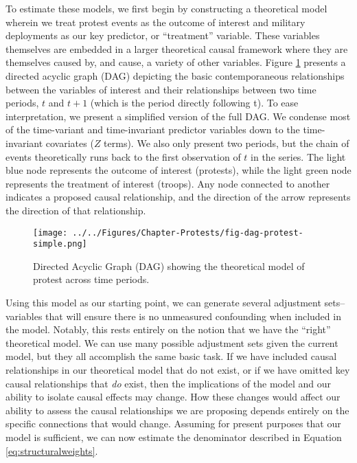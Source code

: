 		To estimate these models, we first begin by constructing a theoretical model wherein we treat protest events as the outcome of interest and military deployments as our key predictor, or ``treatment'' variable. These variables themselves are embedded in a larger theoretical causal framework where they are themselves caused by, and cause, a variety of other variables. Figure \ref{fig:dagtroops} presents a directed acyclic graph (DAG) depicting the basic contemporaneous relationships between the variables of interest and their relationships between two time periods, $t$ and $t+1$ (which is the period directly following t). To ease interpretation, we present a simplified version of the full DAG. We condense most of the time-variant and time-invariant predictor variables down to the time-invariant covariates ($Z$ terms). We also only present two periods, but the chain of events theoretically runs back to the first observation of $t$ in the series. The light blue node represents the outcome of interest (protests), while the light green node represents the treatment of interest (troops). Any node connected to another indicates a proposed causal relationship, and the direction of the arrow represents the direction of that relationship.
		
		\begin{figure}[t]
			\centering\texttt{[image: ../../Figures/Chapter-Protests/fig-dag-protest-simple.png]}
			\caption{Directed Acyclic Graph (DAG) showing the theoretical model of protest across time periods.}
			\label{fig:dagtroops}
		\end{figure}
		
		Using this model as our starting point, we can generate several adjustment sets-- variables that will ensure there is no unmeasured confounding when included in the model. Notably, this rests entirely on the notion that we have the ``right'' theoretical model. We can use many possible adjustment sets given the current model, but they all accomplish the same basic task. If we have included causal relationships in our theoretical model that do not exist, or if we have omitted key causal relationships that \textit{do} exist, then the implications of the model and our ability to isolate causal effects may change. How these changes would affect our ability to assess the causal relationships we are proposing depends entirely on the specific connections that would change. Assuming for present purposes that our model is sufficient, we can now estimate the denominator described in Equation \ref{eq:structuralweights}.
		
